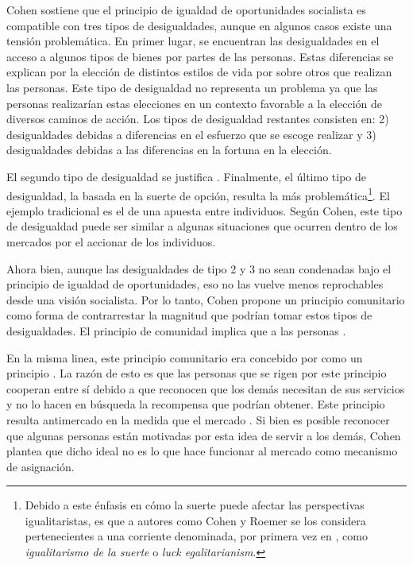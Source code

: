 Cohen sostiene que el principio de igualdad de oportunidades socialista es compatible con tres tipos de desigualdades, aunque en algunos casos existe una tensión problemática. En primer lugar, se encuentran las desigualdades en el acceso a algunos tipos de bienes por partes de las personas. Estas diferencias se explican por la elección de distintos estilos de vida por sobre otros que realizan las personas. Este tipo de desigualdad no representa un problema ya que las personas realizarían estas elecciones en un contexto favorable a la elección de diversos caminos de acción. Los tipos de desigualdad restantes consisten en: 2) desigualdades debidas a diferencias en el esfuerzo que se escoge realizar y 3) desigualdades debidas a las diferencias en la fortuna en la elección.

El segundo tipo de desigualdad se justifica  \citep[p. 189]{Cohen_2014c}. Finalmente, el último tipo de desigualdad, la basada en la suerte de opción, resulta la más problemática\footnote{Debido a este énfasis en cómo la suerte puede afectar las perspectivas igualitaristas, es que a autores como Cohen y Roemer se los considera pertenecientes a una corriente denominada, por primera vez en \citet{Anderson_1999}, como \textit{igualitarismo de la suerte} o \textit{luck egalitarianism}.}. El ejemplo tradicional es el de una apuesta entre individuos. Según Cohen, este tipo de desigualdad puede ser similar a algunas situaciones que ocurren dentro de los mercados por el accionar de los individuos.

Ahora bien, aunque las desigualdades de tipo 2 y 3 no sean condenadas bajo el principio de igualdad de oportunidades, eso no las vuelve menos reprochables desde una visión socialista. Por lo tanto, Cohen propone un principio comunitario como forma de contrarrestar la magnitud que podrían tomar estos tipos de desigualdades. El principio de comunidad implica que a las personas  \citep[p. 191]{Cohen_2014c}. 

En la misma linea, este principio comunitario era concebido por \citet{Cohen_2014b} como un principio . La razón de esto es que las personas que se rigen por este principio cooperan entre sí debido a que reconocen que los demás necesitan de sus servicios y no lo hacen en búsqueda la recompensa que podrían obtener. Este principio resulta antimercado en la medida que el mercado  \citep[p. 59]{Cohen_2014b}. Si bien es posible reconocer que algunas personas están motivadas por esta idea de servir a los demás, Cohen plantea que dicho ideal no es lo que hace funcionar al mercado como mecanismo de asignación.

